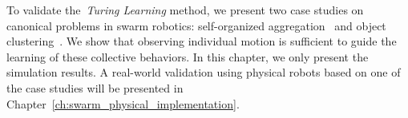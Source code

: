 To validate the~\textit{Turing Learning} method, we present two case studies on canonical problems in swarm robotics: self-organized aggregation~\cite{Gauci2014_ijrr} and object clustering~\cite{Melvin2014_aamas}. We show that observing individual motion is sufficient to guide the learning of these collective behaviors. In this chapter, we only present the simulation results. A real-world validation using physical robots based on one of the case studies will be presented in Chapter~\ref{ch:swarm_physical_implementation}.


